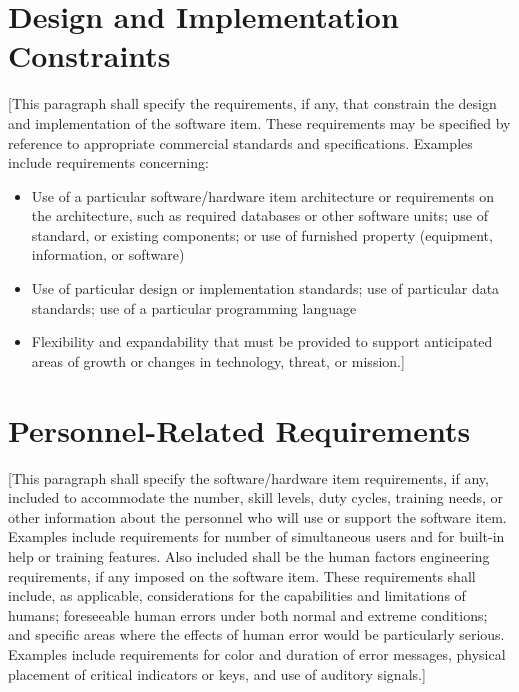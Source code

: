 \section{Design and Implementation Constraints\label{ref-024}}

[This paragraph shall specify the requirements, if any, that constrain the design and implementation of the software item. These requirements may be specified by reference to appropriate commercial standards and specifications. Examples include requirements concerning:

\begin{itemize}
\item Use of a particular software/hardware item architecture or requirements on the architecture, such as required databases or other software units; use of standard, or existing components; or use of furnished property (equipment, information, or software)

\item Use of particular design or implementation standards; use of particular data standards; use of a particular programming language

\item Flexibility and expandability that must be provided to support anticipated areas of growth or changes in technology, threat, or mission.]

\end{itemize}
\section{Personnel-Related Requirements\label{ref-025}}

[This paragraph shall specify the software/hardware item requirements, if any, included to accommodate the number, skill levels, duty cycles, training needs, or other information about the personnel who will use or support the software item. Examples include requirements for number of simultaneous users and for built-in help or training features. Also included shall be the human factors engineering requirements, if any imposed on the software item. These requirements shall include, as applicable, considerations for the capabilities and limitations of humans; foreseeable human errors under both normal and extreme conditions; and specific areas where the effects of human error would be particularly serious. Examples include requirements for color and duration of error messages, physical placement of critical indicators or keys, and use of auditory signals.]

